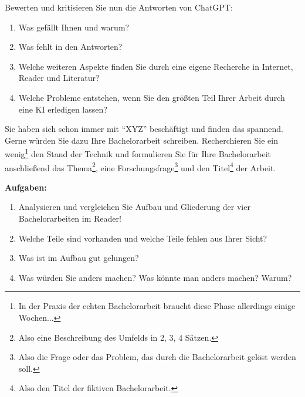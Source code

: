 \documentclass[a4paper]{article}%
\begin{document}
Bewerten und kritisieren Sie nun die Antworten von ChatGPT: 
\begin{enumerate}
\item Was gefällt Ihnen und warum?
\item Was fehlt in den Antworten? 
\item Welche weiteren Aspekte finden Sie durch eine eigene
Recherche in Internet, Reader und Literatur?
\item Welche Probleme entstehen, wenn Sie den größten Teil Ihrer Arbeit durch eine
KI
erledigen lassen?
\end{enumerate}






Sie haben sich schon immer mit \enquote{XYZ} beschäftigt und finden das spannend.
Gerne würden Sie dazu Ihre Bachelorarbeit schreiben. Recherchieren Sie
ein wenig\footnote{In der Praxis der echten Bachelorarbeit 
braucht diese Phase allerdings einige Wochen...}
den Stand der Technik und formulieren Sie für Ihre Bachelorarbeit
anschließend das Thema\footnote{Also eine Beschreibung des Umfelds in
2, 3, 4 Sätzen.}, 
eine Forschungsfrage\footnote{Also die Frage oder das Problem, das durch die Bachelorarbeit
gelöst werden soll.} und den Titel\footnote{Also den Titel der fiktiven Bachelorarbeit.} der Arbeit.




\textbf{Aufgaben:}
\begin{enumerate}
\item Analysieren und vergleichen Sie Aufbau und Gliederung der vier Bachelorarbeiten im Reader!
\item Welche Teile sind vorhanden und welche Teile fehlen aus Ihrer Sicht? 
\item Was ist im Aufbau gut gelungen? 
\item Was würden Sie anders machen? Was könnte man anders machen? Warum?
\end{enumerate}







\end{document}
